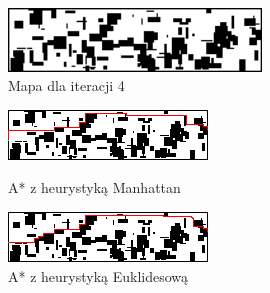\documentclass[12pt,twoside]{article}
\begin{document}
\clearpage
%
\begin{figure}[ht]
    \centering
    \includegraphics[width=0.6\textwidth]{figures/static_algo/map_4.png}
    \caption{Mapa dla iteracji 4}
    \label{fig:map_4}
\end{figure}

\begin{figure}[ht]
    \centering
    \begin{minipage}{0.4\textwidth}
        \centering
        \includegraphics[width=\linewidth]{figures/static_algo/map_astar_manhattan_4.png}
        \caption*{A* z heurystyką Manhattan}
        \label{fig:map_astar_manhattan_4}
    \end{minipage}
    \hspace{0.1\textwidth}
    \begin{minipage}{0.4\textwidth}
        \centering
        \includegraphics[width=\linewidth]{figures/static_algo/map_astar_euclidean_4.png}
        \caption*{A* z heurystyką Euklidesową}
        \label{fig:map_astar_euclidean_4}
    \end{minipage}
    \vspace{0.5cm}
    

\end{figure}
\end{document}
